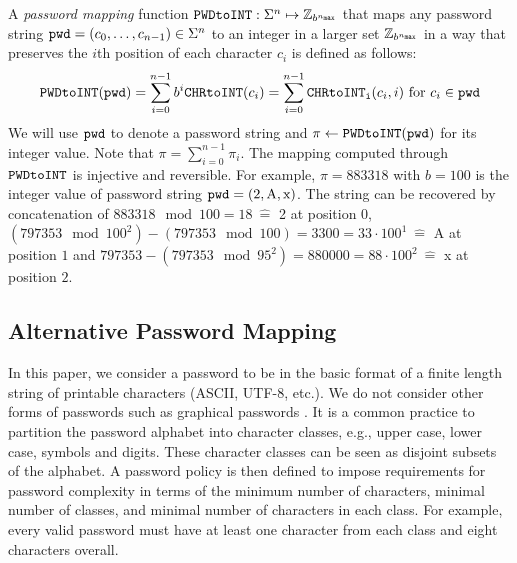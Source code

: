 A \emph{password mapping} function $\texttt{PWDtoINT}:\Sigma^n\mapsto\mathbb{Z}_{b^{{n_\mathtt{max}}}}$ that maps any password string $\mathtt{pwd}=(c_{0},\dots,c_{n-1})\in\Sigma^n$ to an integer in a larger set $\mathbb{Z}_{b^{{n_\mathtt{max}}}}$ in a way that preserves the $i$th position of each character $c_i$ is defined as follows:
\[
\texttt{PWDtoINT}(\mathtt{pwd}) = \sum_{i=0}^{n-1}b^{i} \texttt{CHRtoINT}(c_{i}) = \sum_{i=0}^{n-1}\texttt{CHRtoINT}_\texttt{i}(c_i, i) \textrm{ for } c_i\in\mathtt{pwd}
\]
We will use $\mathtt{pwd}$ to denote a password string and $\pi \gets \texttt{PWDtoINT}(\mathtt{pwd})$ for its integer value. Note that $\pi = \sum_{i=0}^{n-1}\pi_i$. %
The mapping computed through $\texttt{PWDtoINT}$ is injective and reversible. For example, $\pi = 883318$ with $b=100$ is the integer value of password string $\mathtt{pwd} = (\textrm{2},\textrm{A},\textrm{x})$. The string can be recovered by concatenation of $883318\mod 100=18~ \widehat{=}$ 2 at position 0, $(797353\mod 100^2)-(797353\mod 100)=3300=33\cdot 100^1~ \widehat{=}$ A at position $1$ and $797353-(797353\mod95^2)=880000=88\cdot 100^2~ \widehat{=}$ x at position $2$.

\subsection{Alternative Password Mapping}
In this paper, we consider a password to be in the basic format of a finite length string of printable characters (ASCII, UTF-8, etc.). 
We do not consider other forms of passwords such as graphical passwords \cite{suo05}. 
It is a common practice to partition the password alphabet into character classes, e.g., upper case, lower case, symbols and digits. 
These character classes can be seen as disjoint subsets of the alphabet. 
A password policy is then defined to impose requirements for password complexity in terms of the minimum number of characters, minimal number of classes, and minimal number of characters in each class.
For example, every valid password must have at least one character from each class and eight characters overall.

